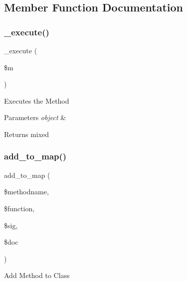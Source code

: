 \subsection{Member Function Documentation}
\mbox{\label{class_c_i___xmlrpcs_a2f039adb8ec59c693300993c95138b46}} 
\subsubsection{\texorpdfstring{\+\_\+execute()}{\_execute()}}
{\footnotesize\ttfamily \+\_\+execute (\begin{DoxyParamCaption}\item[{}]{\$m }\end{DoxyParamCaption})\hspace{0.3cm}{\ttfamily [protected]}}

Executes the Method


\begin{DoxyParams}{Parameters}
{\em object} & \\
\hline
\end{DoxyParams}
\begin{DoxyReturn}{Returns}
mixed 
\end{DoxyReturn}
\mbox{\label{class_c_i___xmlrpcs_a73b29191620c55a5e2d3fda3a5c3cf44}} 
\subsubsection{\texorpdfstring{add\+\_\+to\+\_\+map()}{add\_to\_map()}}
{\footnotesize\ttfamily add\+\_\+to\+\_\+map (\begin{DoxyParamCaption}\item[{}]{\$methodname,  }\item[{}]{\$function,  }\item[{}]{\$sig,  }\item[{}]{\$doc }\end{DoxyParamCaption})}

Add Method to Class


